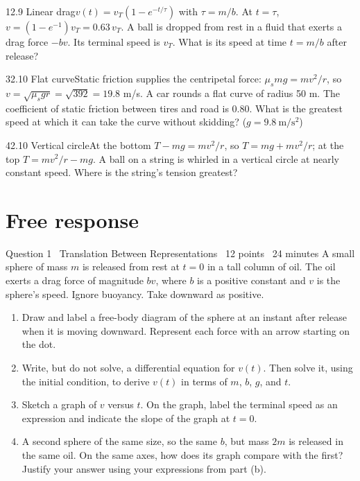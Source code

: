\documentclass[11pt]{article}
\begin{document}
\begin{q}{1}{2.9 Linear drag}{$v(t) = v_T(1 - e^{-t/\tau})$ with $\tau = m/b$. At $t = \tau$, $v = (1 - e^{-1})v_T = 0.63\,v_T$.}
A ball is dropped from rest in a fluid that exerts a drag force $-bv$. Its terminal speed is $v_T$. What is its speed at time $t = m/b$ after release?
\end{q}
\begin{q}{3}{2.10 Flat curve}{Static friction supplies the centripetal force: $\mu_s mg = mv^2/r$, so $v = \sqrt{\mu_s g r} = \sqrt{392} = 19.8$ m/s.}
A car rounds a flat curve of radius 50 m. The coefficient of static friction between tires and road is 0.80. What is the greatest speed at which it can take the curve without skidding? ($g = 9.8\ \mathrm{m/s^2}$)
\end{q}
\begin{q}{4}{2.10 Vertical circle}{At the bottom $T - mg = mv^2/r$, so $T = mg + mv^2/r$; at the top $T = mv^2/r - mg$.}
A ball on a string is whirled in a vertical circle at nearly constant speed. Where is the string's tension greatest?
\end{q}

\section{Free response}

\begin{frq}{Question 1 \textperiodcentered\ Translation Between Representations \textperiodcentered\ 12 points \textperiodcentered\ 24 minutes}
A small sphere of mass $m$ is released from rest at $t = 0$ in a tall column of oil. The oil exerts a drag force of magnitude $bv$, where $b$ is a positive constant and $v$ is the sphere's speed. Ignore buoyancy. Take downward as positive.

\begin{enumerate}[label=(\alph*),leftmargin=2em,itemsep=4pt]
\item Draw and label a free-body diagram of the sphere at an instant after release when it is moving downward. Represent each force with an arrow starting on the dot. 
\item Write, but do not solve, a differential equation for $v(t)$. Then solve it, using the initial condition, to derive $v(t)$ in terms of $m$, $b$, $g$, and $t$. 
\item Sketch a graph of $v$ versus $t$. On the graph, label the terminal speed as an expression and indicate the slope of the graph at $t = 0$. 
\item A second sphere of the same size, so the same $b$, but mass $2m$ is released in the same oil. On the same axes, how does its graph compare with the first? Justify your answer using your expressions from part (b). 
\end{enumerate}
\end{frq}
\end{document}

